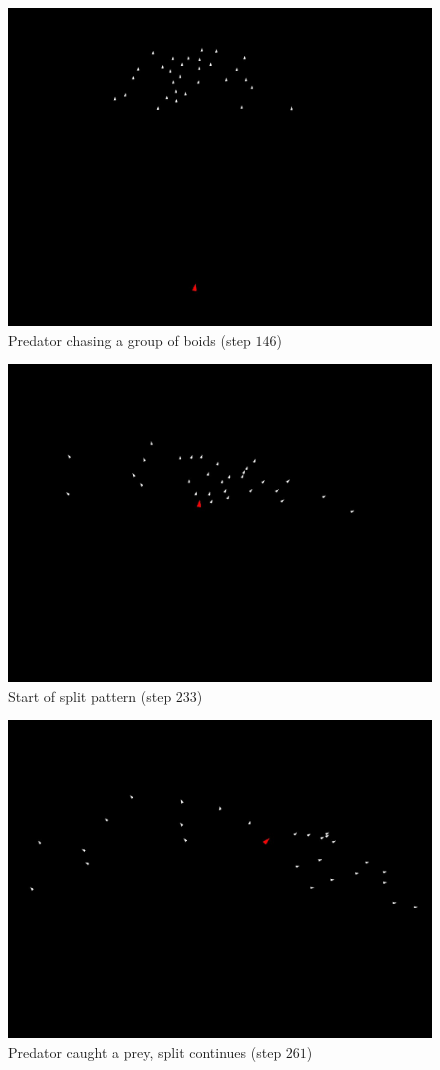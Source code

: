 \documentclass[9pt]{pnas-new}
\begin{document}
\begin{figure}[h]
    \centering
    \includegraphics[width=0.6\linewidth]{boids_step_146.jpg}
    \caption{Predator chasing a group of boids (step $146$)}
\end{figure}
\begin{figure}[h]
    \centering
    \includegraphics[width=0.6\linewidth]{boids_step_233.jpg}
    \caption{Start of split pattern (step $233$)}
\end{figure}
\begin{figure}[h]
    \centering
    \includegraphics[width=0.7\linewidth]{boids_step_261.jpg}
    \caption{Predator caught a prey, split continues (step $261$)}
\end{figure}
\end{document}
